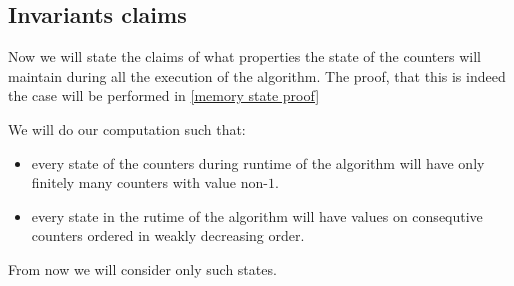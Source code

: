 \subsection{Invariants claims}
Now we will state the claims of what properties the state of the counters will maintain 
during all the execution of the algorithm. The proof, that this is indeed the case will 
be performed in 
\ref{memory state proof}
\begin{claim}\label{valid state of counters}
We will do our computation such that:
\begin{itemize}
\item every state of the counters during runtime of the algorithm will have only finitely many 
counters with value non-$1$. 
\item every state in the rutime of the algorithm 
will have values on consequtive counters ordered in weakly decreasing order.
\end{itemize}
\end{claim}
From now we will 
consider only such states. 

